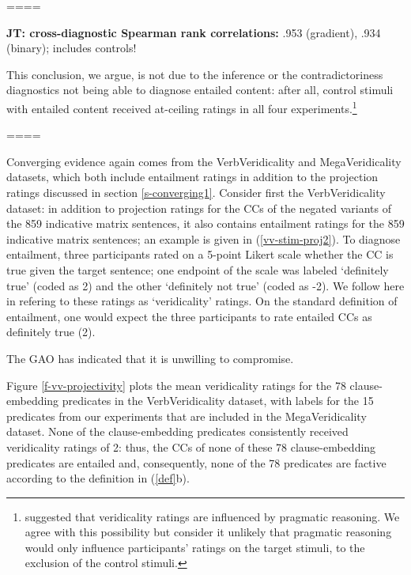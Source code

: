 \documentclass[11pt,fleqn]{article}
\newcommand{\6}{\mbox{$[\hspace*{-.6mm}[$}}
\newcommand{\9}{\mbox{$]\hspace*{-.6mm}]$}}
\newcommand{\jt}[1]{\textbf{\color{blue}JT: #1}}
\begin{document}
{====

\jt{cross-diagnostic Spearman rank correlations:} .953 (gradient), .934 (binary); includes controls!

This conclusion, we argue, is not due to the inference or the contradictoriness diagnostics not being able to diagnose entailed content: after all, control stimuli with entailed content received at-ceiling ratings in all four experiments.\footnote{\citet[329]{demarneffe-etal2012} suggested that veridicality ratings are influenced by pragmatic reasoning. We agree with this possibility but consider it unlikely that pragmatic reasoning would only influence participants' ratings on the target stimuli, to the exclusion of the control stimuli.} 

====

Converging evidence again comes from the VerbVeridicality and MegaVeridicality datasets, which both include entailment ratings in addition to the projection ratings discussed in section \ref{s-converging1}. Consider first the VerbVeridicality dataset: in addition to projection ratings for the CCs of the negated variants of the 859 indicative matrix sentences, it also contains entailment ratings for the 859 indicative matrix sentences; an example is given in (\ref{vv-stim-proj2}). To diagnose entailment, three participants rated on a 5-point Likert scale whether the CC is true given the target sentence; one endpoint of the scale was labeled `definitely true' (coded as 2) and the other `definitely not true' (coded as -2). We follow \citet{ross-pavlick2019} here in refering to these ratings as `veridicality' ratings. On the standard definition of entailment, one would expect the three participants to rate entailed CCs as definitely true (2).

\begin{exe}
\ex\label{vv-stim-proj2} The GAO has indicated that it is unwilling to compromise.
\end{exe}

Figure \ref{f-vv-projectivity} plots the mean veridicality ratings for the 78 clause-embedding predicates in the VerbVeridicality dataset, with labels for the 15 predicates from our experiments that are included in the MegaVeridicality dataset. None of the clause-embedding predicates consistently received veridicality ratings of 2: thus, the CCs of none of these 78 clause-embedding predicates are entailed and, consequently, none of the 78 predicates are factive according to the definition in (\ref{def}b).


}
\end{document}
